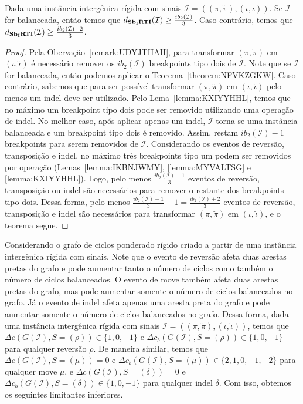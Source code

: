 \begin{theorem}\label{theorem:JGVDYLDM}
Dada uma instância intergênica rígida com sinais $\mathcal{I}=((\pi,\breve\pi),(\iota,\breve\iota))$. Se $\mathcal{I}$ for balanceada, então temos que $d_{\textbf{Sb\textsubscript{I}RTI}}(\mathcal{I}) \ge \frac{ib_2(\mathcal{I})}{3}$. Caso contrário, temos que $d_{\textbf{Sb\textsubscript{I}RTI}}(\mathcal{I}) \ge \frac{ib_2(\mathcal{I}) + 2}{3}$.
\end{theorem}
\begin{proof}
Pela Obervação~\ref{remark:UDYJTHAH}, para transformar $(\pi,\breve\pi)$ em $(\iota,\breve\iota)$ é necessário remover os $ib_2(\mathcal{I})$ breakpoints tipo dois de $\mathcal{I}$. Note que se $\mathcal{I}$ for balanceada, então podemos aplicar o Teorema~\ref{theorem:NFVKZGKW}. Caso contrário, sabemos que para ser possível transformar $(\pi,\breve\pi)$ em $(\iota,\breve\iota)$ pelo menos um indel deve ser utilizado. Pelo Lema~\ref{lemma:KXIYYHHL}, temos que no máximo um breakpoint tipo dois pode ser removido utilizando uma operação de indel. No melhor caso, após aplicar apenas um indel, $\mathcal{I}$  torna-se uma instância balanceada e um breakpoint tipo dois é removido. Assim, restam $ib_2(\mathcal{I}) - 1$ breakpoints para serem removidos de $\mathcal{I}$. Considerando os eventos de reversão, transposição e indel, no máximo três breakpoints tipo um podem ser removidos por operação (Lemas~\ref{lemma:IKBNJWMY}, \ref{lemma:MYVALTSG} e \ref{lemma:KXIYYHHL}). Logo, pelo menos $\frac{ib_2(\mathcal{I}) - 1}{3}$ eventos de reversão, transposição ou indel são necessários para remover o restante dos breakpoints tipo dois. Dessa forma, pelo menos $\frac{ib_2(\mathcal{I}) - 1}{3} + 1 = \frac{ib_2(\mathcal{I}) + 2}{3}$ eventos de reversão, transposição e indel são necessários para transformar $(\pi,\breve\pi)$ em $(\iota,\breve\iota)$, e o teorema segue.
\end{proof}

Considerando o grafo de ciclos ponderado rígido criado a partir de uma instância intergênica rígida com sinais. Note que o evento de reversão afeta duas arestas pretas do grafo e pode aumentar tanto o número de ciclos como também o número de ciclos balanceados. O evento de move também afeta duas arestas pretas do grafo, mas pode aumentar somente o número de ciclos balanceados no grafo. Já o evento de indel afeta apenas uma aresta preta do grafo e pode aumentar somente o número de ciclos balanceados no grafo. Dessa forma, dada uma instância intergênica rígida com sinais $\mathcal{I} = ((\pi,\breve\pi),(\iota,\breve\iota))$, temos que $\Delta c(G(\mathcal{I}), S=(\rho)) \in \{1,0,-1\}$ e $\Delta c_b(G(\mathcal{I}), S=(\rho)) \in \{1,0,-1\}$ para qualquer reversão $\rho$. De maneira similar, temos que $\Delta c(G(\mathcal{I}), S=(\mu)) = 0$ e $\Delta c_b(G(\mathcal{I}), S=(\mu)) \in \{2,1,0,{-1},{-2}\}$ para qualquer move $\mu$, e $\Delta c(G(\mathcal{I}), S=(\delta)) = 0$ e $\Delta c_b(G(\mathcal{I}), S=(\delta)) \in \{1,0,{-1}\}$ para qualquer indel $\delta$. Com isso, obtemos os seguintes limitantes inferiores.

